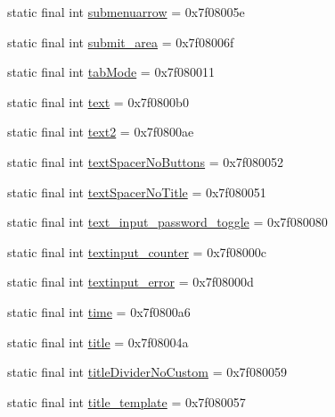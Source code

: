 \begin{CompactItemize}
static final int \hyperlink{classandroid_1_1support_1_1graphics_1_1drawable_1_1_r_1_1id_2955d193b538c4e0122daaee0831109b}{submenuarrow} = 0x7f08005e
\item 
static final int \hyperlink{classandroid_1_1support_1_1graphics_1_1drawable_1_1_r_1_1id_b4d7e3194ce58de838d3f2b4691b34ee}{submit\_\-area} = 0x7f08006f
\item 
static final int \hyperlink{classandroid_1_1support_1_1graphics_1_1drawable_1_1_r_1_1id_00ffe15ba4fd7e756dc720dc00ca805f}{tabMode} = 0x7f080011
\item 
static final int \hyperlink{classandroid_1_1support_1_1graphics_1_1drawable_1_1_r_1_1id_33605f02e34adc85c97f9f0ab5da1e5e}{text} = 0x7f0800b0
\item 
static final int \hyperlink{classandroid_1_1support_1_1graphics_1_1drawable_1_1_r_1_1id_22879920daf31e7555769d026f0ed4dc}{text2} = 0x7f0800ae
\item 
static final int \hyperlink{classandroid_1_1support_1_1graphics_1_1drawable_1_1_r_1_1id_ac7294fce6d3068a79b76e761b94c33c}{textSpacerNoButtons} = 0x7f080052
\item 
static final int \hyperlink{classandroid_1_1support_1_1graphics_1_1drawable_1_1_r_1_1id_93888cc38a5b31a6caa56b284354d603}{textSpacerNoTitle} = 0x7f080051
\item 
static final int \hyperlink{classandroid_1_1support_1_1graphics_1_1drawable_1_1_r_1_1id_168365937b42bf8b48dc11c89942c047}{text\_\-input\_\-password\_\-toggle} = 0x7f080080
\item 
static final int \hyperlink{classandroid_1_1support_1_1graphics_1_1drawable_1_1_r_1_1id_b0198923f9a35b6b8c980bdbbfa29123}{textinput\_\-counter} = 0x7f08000c
\item 
static final int \hyperlink{classandroid_1_1support_1_1graphics_1_1drawable_1_1_r_1_1id_2c0b1142ddd32cc4f083963a7078d06b}{textinput\_\-error} = 0x7f08000d
\item 
static final int \hyperlink{classandroid_1_1support_1_1graphics_1_1drawable_1_1_r_1_1id_1518949b52321a37dc979412cb3adf36}{time} = 0x7f0800a6
\item 
static final int \hyperlink{classandroid_1_1support_1_1graphics_1_1drawable_1_1_r_1_1id_74d998a0f81cde2daf81d4c27e648e8c}{title} = 0x7f08004a
\item 
static final int \hyperlink{classandroid_1_1support_1_1graphics_1_1drawable_1_1_r_1_1id_16ed55c9640ec6a447bc1920e94de5fc}{titleDividerNoCustom} = 0x7f080059
\item 
static final int \hyperlink{classandroid_1_1support_1_1graphics_1_1drawable_1_1_r_1_1id_772fb1e4818fb6a6f0860468f5037905}{title\_\-template} = 0x7f080057

\end{CompactItemize}
